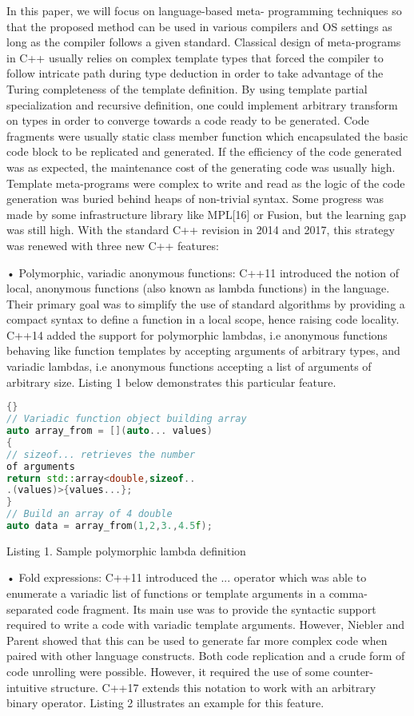 \documentclass[../../main.tex]{subfiles}
\begin{document}
In this paper, we will focus on language-based meta-
programming techniques so that the proposed method can
be used in various compilers and OS settings as long as the
compiler follows a given standard.
Classical design of meta-programs in C++ usually relies
on complex template types that forced the compiler to follow
intricate path during type deduction in order to take advantage
of the Turing completeness of the template definition. By
using template partial specialization and recursive definition,
one could implement arbitrary transform on types in order
to converge towards a code ready to be generated. Code
fragments were usually static class member function which
encapsulated the basic code block to be replicated and
generated. If the efficiency of the code generated was as
expected, the maintenance cost of the generating code was
usually high. Template meta-programs were complex to write
and read as the logic of the code generation was buried
behind heaps of non-trivial syntax. Some progress was made
by some infrastructure library like MPL[16] or Fusion, but
the learning gap was still high.
With the standard C++ revision in 2014 and 2017, this
strategy was renewed with three new C++ features:

• Polymorphic, variadic anonymous functions: C++11
introduced the notion of local, anonymous functions
(also known as lambda functions) in the language.
Their primary goal was to simplify the use of standard
algorithms by providing a compact syntax to define a
function in a local scope, hence raising code locality.
C++14 added the support for polymorphic lambdas, i.e
anonymous functions behaving like function templates
by accepting arguments of arbitrary types, and variadic
lambdas, i.e anonymous functions accepting a list of
arguments of arbitrary size. Listing 1 below demonstrates
this particular feature.

\begin{lstlisting}[language=c++]{}
// Variadic function object building array
auto array_from = [](auto... values)
{
// sizeof... retrieves the number
of arguments
return std::array<double,sizeof..
.(values)>{values...};
}
// Build an array of 4 double
auto data = array_from(1,2,3.,4.5f);
\end{lstlisting}
Listing 1. Sample polymorphic lambda definition

• Fold expressions: C++11 introduced the ... operator
which was able to enumerate a variadic list of functions
or template arguments in a comma-separated code
fragment. Its main use was to provide the syntactic
support required to write a code with variadic template
arguments. However, Niebler and Parent showed that
this can be used to generate far more complex code
when paired with other language constructs. Both
code replication and a crude form of code unrolling
were possible. However, it required the use of some
counter-intuitive structure. C++17 extends this notation
to work with an arbitrary binary operator. Listing 2
illustrates an example for this feature.
\end{document}

